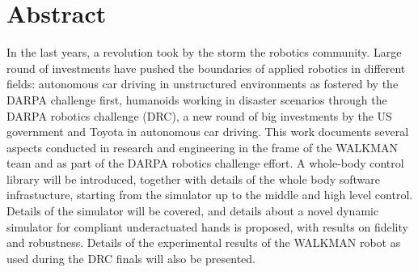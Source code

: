 %
\chapter*{Abstract}
\label{sec:abstract}
\vspace*{-10mm}
In the last years, a revolution took by the storm the robotics community. Large round of investments have pushed the boundaries of applied robotics in different fields: autonomous car driving in unstructured environments as fostered by the DARPA challenge first, humanoids working in disaster scenarios through the DARPA robotics challenge (DRC), a new round of big investments by the US government and Toyota in autonomous car driving. This work documents several aspects conducted in research and engineering in the frame of the WALKMAN team and as part of the DARPA robotics challenge effort. A whole-body control library will be introduced, together with details of the whole body software infrastucture, starting from the simulator up to the middle and high level control. Details of the simulator will be covered, and details about a novel dynamic simulator for compliant underactuated hands is proposed, with results on fidelity and robustness. Details of the experimental results of the WALKMAN robot as used during the DRC finals will also be presented.

\vspace*{20mm}


